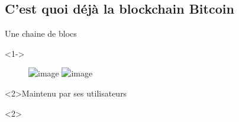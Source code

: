 \documentclass[presentation]{beamer}
\begin{document}
\subsection{C'est quoi déjà la blockchain Bitcoin}
\label{sec:org4141334}
\begin{frame}[label={sec:org9a3c089}]{Une chaine de blocs}
\begin{block}<1->{}
\begin{figure}[ht]
   \centering
   \includegraphics<1>[width=\textwidth]{Images/anatomy-of-a-chain-1.png}
   \includegraphics<2>[width=.3\textwidth]{Images/anatomy-of-a-chain-1.png}   
\end{figure}
\end{block}

\begin{block}<2>{Maintenu par ses utilisateurs}

\begin{block}<2>{}
\end{block}
\end{block}
\end{frame}
\end{document}
